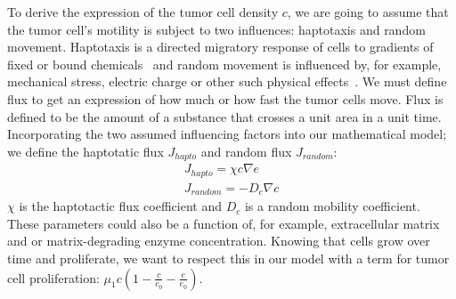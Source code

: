 To derive the expression of the tumor cell density $c$, we are going to assume that the tumor cell's motility is subject to two influences: haptotaxis and random movement. Haptotaxis is a directed migratory response of cells to gradients of fixed or bound chemicals~\cite{anderson_continuous_1998} and random movement is influenced by, for example, mechanical stress, electric charge or other such physical effects~\cite{Merino-Casallo2022-di}. We must define flux to get an expression of how much or how fast the tumor cells move. Flux is defined to be the amount of a substance that crosses a unit area in a unit time. Incorporating the two assumed influencing factors into our mathematical model; we define the haptotatic flux $J_{hapto}$ and random flux $J_{random}$:
\begin{align*}
    J_{hapto} = \chi c \nabla e \\
    J_{random} = -D_c \nabla c
\end{align*}
$\chi$ is the haptotactic flux coefficient and $D_c$ is a random mobility coefficient. These parameters could also be a function of, for example, extracellular matrix and or matrix-degrading enzyme concentration. Knowing that cells grow over time and proliferate, we want to respect this in our model with a term for tumor cell proliferation: $\mu_1 c (1-\frac{c}{c_0} - \frac{e}{e_0})$.

